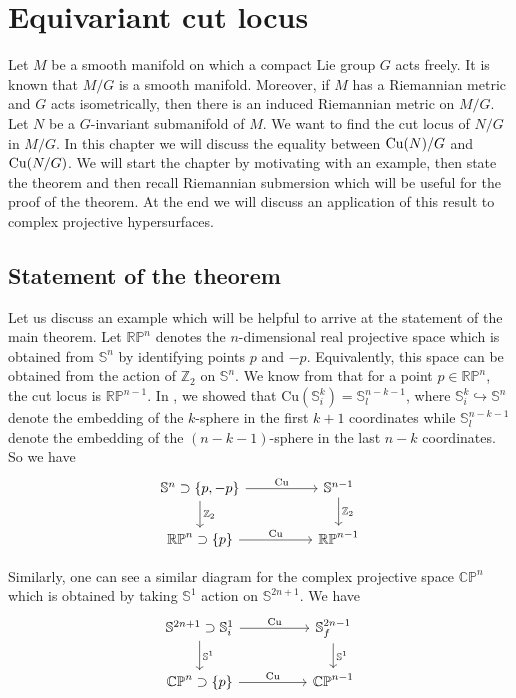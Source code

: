 \chapter[Equivariant cut locus]{Equivariant cut locus}\label{ch:equivariantCutLocusTheorem}
\minitoc

\hfb Let $M$ be a smooth manifold on which a compact Lie group $G$ acts freely. It is known that $M/G$ is a smooth manifold. Moreover, if $M$ has a Riemannian metric and $G$ acts isometrically, then there is an induced Riemannian metric on $M/G$. Let $N$ be a $G$-invariant  submanifold of $M$. We want to find the cut locus of $N/G$ in $M/G$. In this chapter we will discuss the equality between $\cutn/G$ and $\cutn[N/G]$.  We will start the chapter by motivating with an example, then state the theorem and then recall Riemannian submersion which will be useful for the proof of the theorem. At the end we will discuss an application of this result to complex projective hypersurfaces.

\section{Statement of the theorem}
\hfb Let us discuss an example which will be helpful to arrive at the statement of the main theorem. Let $\mathbb{RP}^n$ denotes the $n$-dimensional real projective space which is obtained from $\mathbb{S}^n$ by identifying points $p$ and $-p$. Equivalently, this space can be obtained from the action of $\mathbb{Z}_2$ on $\mathbb{S}^n$. We know from  that for a point $p\in \mathbb{RP}^n$, the cut locus is $\mathbb{RP}^{n-1}$. In , we showed that $\mathrm{Cu}\left(\mathbb{S}_i^k\right)=\mathbb{S}_l^{n-k-1}$, where $\mathbb{S}_i^k \hookrightarrow \mathbb{S}^n$ denote the embedding of the $k$-sphere in the first $k+1$ coordinates while $\mathbb{S}^{n-k-1}_l$ denote the embedding of the $(n-k-1)$-sphere in the last $n-k$ coordinates. So we have
\begin{displaymath}
	\begin{tikzcd}
		\mathbb{S}^n \supset\left\{p,-p\right\}\arrow[d,  "\mathbb{Z}_2"] \arrow[rr, "\mathrm{Cu}"] &  &  \mathbb{S}^{n-1} \arrow[d, "\mathbb{Z}_2"]\\
		\mathbb{RP}^n \supset\{p\} \arrow[rr, "\mathrm{Cu}"]& & \mathbb{RP}^{n-1}
	\end{tikzcd}
\end{displaymath}

\noindent Similarly, one can see a similar diagram for the complex projective space $\mathbb{CP}^n$ which is obtained by taking $\mathbb{S}^1$ action on $\mathbb{S}^{{2n+1}}$. We have 
\begin{displaymath}
	\begin{tikzcd}
		\mathbb{S}^{2n+1} \supset \mathbb{S}_i^1 \arrow[d,  "\mathbb{S}^1"] \arrow[rr, "\mathrm{Cu}"] &  &  \mathbb{S}^{2n-1}_f \arrow[d, "\mathbb{S}^1"]\\
		\mathbb{CP}^n \supset\{p\} \arrow[rr, "\mathrm{Cu}"]& & \mathbb{CP}^{n-1}
	\end{tikzcd}
\end{displaymath}

